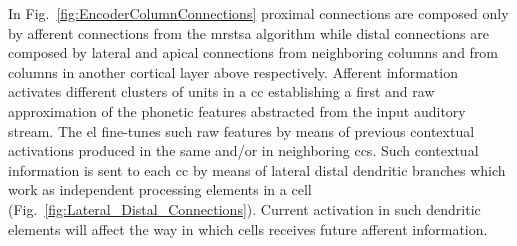{In Fig.~\ref{fig:EncoderColumnConnections} proximal connections are composed only by afferent connections from the \gls{mrstsa} algorithm while distal connections are composed by lateral and apical connections from neighboring columns and from columns in another cortical layer above respectively. Afferent information activates different clusters of units in a \gls{cc} establishing a first and raw approximation of the phonetic features abstracted from the input auditory stream. The \gls{el} fine-tunes such raw features by means of previous contextual activations produced in the same and/or in neighboring \glspl{cc}. Such contextual information is sent to each \gls{cc} by means of lateral distal dendritic branches which work as independent processing elements in a cell (Fig.~\ref{fig:Lateral_Distal_Connections}). Current activation in such dendritic elements will affect the way in which cells receives future afferent information.

}
